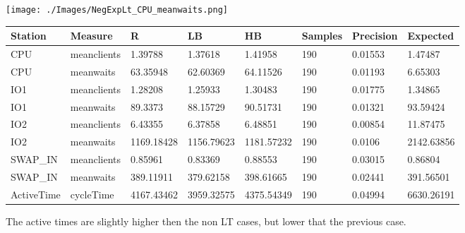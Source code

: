 \documentclass[12pt,a4paper]{article}
\begin{document}
\texttt{[image: ./Images/NegExpLt\_CPU\_meanwaits.png]}


\begin{table}[!ht]
    \centering
    \begin{tabular}{|l|l|l|l|l|l|l|l|}
    \hline
        Station & Measure & R & LB & HB & Samples & Precision & Expected \\ \hline
        CPU & meanclients & 1.39788 & 1.37618 & 1.41958 & 190 & 0.01553 & 1.47487 \\ \hline
        CPU & meanwaits & 63.35948 & 62.60369 & 64.11526 & 190 & 0.01193 & 6.65303 \\ \hline
        IO1 & meanclients & 1.28208 & 1.25933 & 1.30483 & 190 & 0.01775 & 1.34865 \\ \hline
        IO1 & meanwaits & 89.3373 & 88.15729 & 90.51731 & 190 & 0.01321 & 93.59424 \\ \hline
        IO2 & meanclients & 6.43355 & 6.37858 & 6.48851 & 190 & 0.00854 & 11.87475 \\ \hline
        IO2 & meanwaits & 1169.18428 & 1156.79623 & 1181.57232 & 190 & 0.0106 & 2142.63856 \\ \hline
        SWAP\_IN & meanclients & 0.85961 & 0.83369 & 0.88553 & 190 & 0.03015 & 0.86804 \\ \hline
        SWAP\_IN & meanwaits & 389.11911 & 379.62158 & 398.61665 & 190 & 0.02441 & 391.56501 \\ \hline
        ActiveTime & cycleTime & 4167.43462 & 3959.32575 & 4375.54349 & 190 & 0.04994 & 6630.26191 \\ \hline
    \end{tabular}
\end{table}

The active times are slightly higher then the non LT cases, but lower that the previous case.
\end{document}
